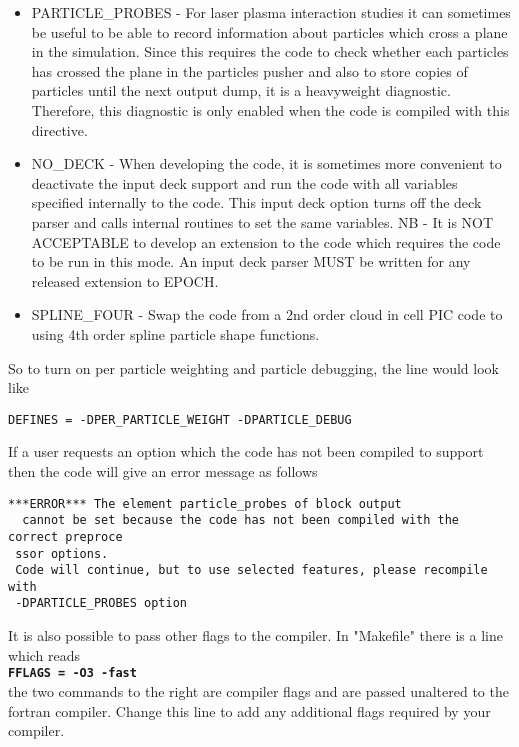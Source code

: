 \documentclass[12pt]{article}
\newcommand{\simpleboxverbatim}{\begin{Verbatim}[obeytabs=true,frame=single,
  framerule=0.5mm,rulecolor=\color{warwickmid}]}
\newcommand{\inlinecode}[1]{{\color{warwickred} \bf\texttt{#1}}}
\newcommand{\nEPOCH}{{\color{warwickdark}\fontfamily{phv}\selectfont EPOCH}}
\begin{document}
\begin{itemize}
  tracer particles. Tracer particles are specified like normal particles, and
  move about as would a normal particle with the same charge and mass, but
  tracer particles do not generate any current and are therefore passive
  elements in the simulation. Any attempt to add particle collision effects
  should remember that tracer species should not interact through collisions.
\item PARTICLE\_PROBES - For laser plasma interaction studies it can sometimes
  be useful to be able to record information about particles which cross a
  plane in the simulation. Since this requires the code to check whether each
  particles has crossed the plane in the particles pusher and also to store
  copies of particles until the next output dump, it is a heavyweight
  diagnostic. Therefore, this diagnostic is only enabled when the code is
  compiled with this directive.
\item NO\_DECK - When developing the code, it is sometimes more convenient to
  deactivate the input deck support and run the code with all variables
  specified internally to the code. This input deck option turns off the deck
  parser and calls internal routines to set the same variables. NB - It is NOT
  ACCEPTABLE to develop an extension to the code which requires the code to be
  run in this mode. An input deck parser MUST be written for any released
  extension to \nEPOCH.
\item SPLINE\_FOUR - Swap the code from a 2nd order cloud in cell PIC code to
  using 4th order spline particle shape functions.
\end{itemize}

So to turn on per particle weighting and particle debugging, the line would
look like\\
\simpleboxverbatim
DEFINES = -DPER_PARTICLE_WEIGHT -DPARTICLE_DEBUG
\end{Verbatim}

If a user requests an option which the code has not been compiled to support
then the code will give an error message as follows
\simpleboxverbatim
 ***ERROR*** The element particle_probes of block output
  cannot be set because the code has not been compiled with the correct preproce
 ssor options.
 Code will continue, but to use selected features, please recompile with
 -DPARTICLE_PROBES option
\end{Verbatim}

It is also possible to pass other flags to the compiler. In "Makefile" there is
a line which reads\\
\inlinecode{FFLAGS = -O3 -fast}\\
the two commands to the right are compiler flags and are passed unaltered to
the fortran compiler. Change this line to add any additional flags required by
your compiler.
\end{document}
